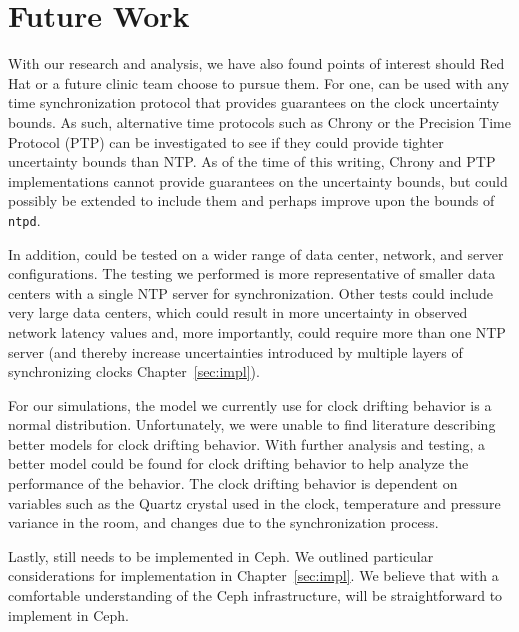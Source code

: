 \chapter{Future Work}
\label{sec:future}

With our research and analysis, we have also found points of interest
should Red Hat or a future clinic team choose to pursue them. For one,
\alg can be used with any time synchronization
protocol that provides guarantees on the clock uncertainty bounds. As
such, alternative time protocols such as Chrony or the Precision Time
Protocol (PTP) can be investigated to see if they could provide
tighter uncertainty bounds than NTP. As of the time of this writing,
Chrony and PTP implementations cannot provide guarantees on the
uncertainty bounds, but could possibly be extended to include them and
perhaps improve upon the bounds of \texttt{ntpd}.

In addition, \alg could be tested on a wider range
of data center, network, and server configurations.
The testing we performed is more representative of smaller data
centers with a single NTP server for synchronization. Other tests
could include very large data centers, which could result in more uncertainty 
in observed network latency values and, more importantly, could require 
more than one NTP server (and thereby increase uncertainties introduced by
multiple layers of synchronizing clocks Chapter~\ref{sec:impl}).

For our simulations, the model we currently use for clock drifting
behavior is a normal distribution. Unfortunately, we were
unable to find literature describing better models for clock drifting
behavior. With further analysis and testing, a better model could be
found for clock drifting behavior to help analyze the performance of
the behavior. The clock drifting behavior is dependent on
variables such as the Quartz crystal used in the clock, temperature and pressure
variance in the room, and changes due to the synchronization process.



Lastly, \alg still needs to be implemented in 
Ceph. We outlined particular considerations for implementation
in Chapter~\ref{sec:impl}. We believe that with a comfortable
understanding of the Ceph infrastructure, \alg will be straightforward 
to implement in Ceph.
